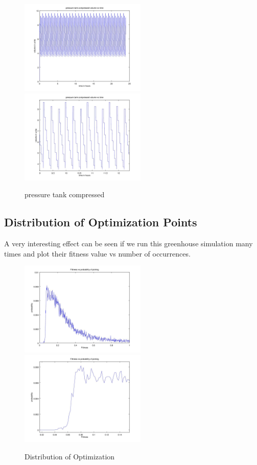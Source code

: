 \documentclass[a4paper,12pt]{article}
\begin{document}
\begin{figure}[ht!]
	\centering
	\includegraphics[width=60mm]{pressure_tank_compressed_volume_1.jpg}
	\includegraphics[width=60mm]{pressure_tank_compressed_volume_2.jpg}
	\caption{pressure tank compressed}
\end{figure}

\subsection{Distribution of Optimization Points}

A very interesting effect can be seen if we run this greenhouse simulation many times and plot their fitness value vs number of occurrences.

\begin{figure}[ht!]
	\centering
	\includegraphics[width=60mm]{distrobution_1.jpg}
	\includegraphics[width=60mm]{distrobution_2.jpg}
	\caption{Distribution of Optimization}
\end{figure}
\end{document}
